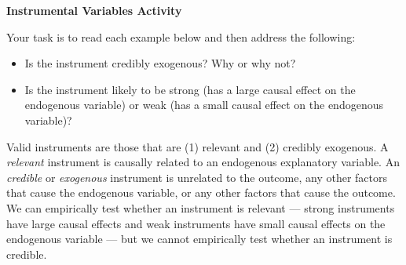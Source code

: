 \documentclass[a4paper,12pt]{article}
\begin{document}
\begin{center}
\textbf{Instrumental Variables Activity}
\end{center}

\noindent Your task is to read each example below and then address the following:
\begin{itemize}
\item Is the instrument credibly exogenous? Why or why not?
\item Is the instrument likely to be strong (has a large causal effect on the endogenous variable) or weak (has a small causal effect on the endogenous variable)?
\end{itemize}

\noindent Valid instruments are those that are (1) relevant and (2) credibly exogenous. A {\em relevant} instrument is causally related to an endogenous explanatory variable. An {\em credible} or {\em exogenous} instrument is unrelated to the outcome, any other factors that cause the endogenous variable, or any other factors that cause the outcome. We can empirically test whether an instrument is relevant --- strong instruments have large causal effects and weak instruments have small causal effects on the endogenous variable --- but we cannot empirically test whether an instrument is credible.
\end{document}
